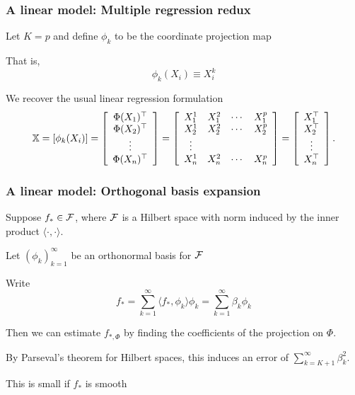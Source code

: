 \documentclass{beamer}
\begin{document}
\begin{frame}
\frametitle{A linear model:  Multiple regression redux}
Let $K = p$ and define $\phi_k$ to be the coordinate projection map
\vsp

 That is, 
 \[
 \phi_k(X_i) \equiv X_i^k
 \]
 \vsp
 
We recover the usual linear regression formulation
\[
\mathbb{X} =
\left[
\phi_k(X_i)
\right]
=
\left[
\begin{array}{c}
\Phi(X_{1})^{\top} \\
\Phi(X_{2})^{\top} \\
\vdots    \\
\Phi(X_{n})^{\top} \\
\end{array}
\right]
= 
\left[
\begin{array}{cccc}
X_{1}^1 & X_{1}^2 & \cdots & X_{1}^p \\
X_{2}^1 & X_{2}^2 & \cdots & X_{2}^p \\
\vdots & & \\
X_{n}^1 & X_{n}^2 & \cdots & X_{n}^p \\
\end{array}
\right]
=
\left[
\begin{array}{cccc}
X_{1}^{\top} \\
X_{2}^{\top} \\
\vdots    \\
X_{n}^{\top} \\
\end{array}
\right].
\]
\end{frame}



\begin{frame}
\frametitle{A linear model: Orthogonal basis expansion}
Suppose $f_* \in \mathcal{F}$, where $\mathcal{F}$ is a Hilbert space with norm induced by the inner product $\langle \cdot, \cdot \rangle$. 
\vsp

Let $(\phi_k)_{k=1}^\infty$ be an orthonormal basis for $\mathcal{F}$

\vsp
Write 
\[
 f_* = \sum_{k=1}^\infty \langle f_*, \phi_k \rangle \phi_k =  \sum_{k=1}^\infty \beta_k \phi_k
\]

\vsp
Then we can estimate $f_{*,\Phi}$ by finding the coefficients of the projection on $\Phi$.  
\vsp

By Parseval's theorem for Hilbert spaces\note, this induces an  error of $\sum_{k=K+1}^{\infty} \beta_k^2$.

\vsp
This is small if $f_*$ is smooth 

\end{frame}
\end{document}
